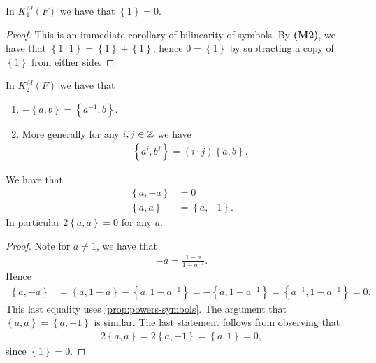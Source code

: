 \documentclass[11pt,openany]{book}
\begin{document}
\begin{proposition} In $K_1^M(F)$ we have that $\left\{ 1 \right\} = 0$.
\end{proposition}
\begin{proof} This is an immediate corollary of bilinearity of symbols. By \textbf{(M2)}, we have that $\left\{ 1\cdot 1 \right\} = \left\{ 1 \right\} + \left\{ 1 \right\}$, hence $0 = \left\{ 1 \right\}$ by subtracting a copy of $\left\{ 1 \right\}$ from either side.
\end{proof}

\begin{proposition}\label{prop:powers-symbols} 
In $K_2^M(F)$ we have that
\begin{enumerate}
    \item $-\left\{ a,b \right\} = \left\{ a^{-1},b \right\}$.
    \item More generally for any $i,j\in \mathbb{Z}$ we have
    \begin{align*}
         \left\{ a^i,b^j \right\} = (i\cdot j) \left\{ a,b \right\}.
    \end{align*}
\end{enumerate}
\end{proposition}

\begin{proposition}\label{prop:KM2-relations} 
\cite[1.1,~1.2]{MilnorK}
We have that
\begin{align*}
    \left\{ a,-a \right\} &= 0 \\
    \left\{ a,a \right\} &= \left\{ a,-1 \right\}.
\end{align*}
In particular $2\left\{ a,a \right\} = 0$ for any $a$.
\end{proposition}
\begin{proof} Note for $a\ne 1$, we have that
\begin{align*}
    -a = \frac{1-a}{ 1- a^{-1}}.
\end{align*}
%
Hence 
\begin{align*}
    \left\{ a,-a \right\} &= \left\{ a,1-a \right\} - \left\{ a, 1-a^{-1} \right\} = -\left\{ a, 1- a^{-1} \right\} = \left\{a^{-1}, 1-a^{-1} \right\} = 0.
\end{align*}
This last equality uses \autoref{prop:powers-symbols}.
The argument that $\left\{ a,a \right\} = \left\{ a,-1 \right\}$ is similar.
The last statement follows from observing that
\begin{align*}
    2\left\{ a,a \right\} = 2 \left\{ a, -1 \right\} = \left\{ a, 1 \right\} = 0,
\end{align*}
since $\left\{ 1 \right\} = 0$.
\end{proof}
\end{document}
